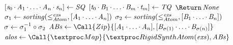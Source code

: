 \documentclass[acmsmall]{acmart}
\begin{document}
\begin{algorithm}
  \caption{\RigidSynth}
  \label{alg:rigidsynth}
  \begin{algorithmic}[1]
    \Function{\RigidSynthAtom}{$\Atom{},\AtomAlt{},\Examples$}
    \Switch{$(\Atom{}, \AtomAlt)$}
    \Case {(\UserDef, \UserDefAlt)}
    \If {$\UserDef \AtomLeq^\Examples \UserDefAlt \BooleanAnd \UserDefAlt
      \AtomLeq^\Examples \UserDef$}
    \State \ReturnVal{\SomeOf{\IdentityLensOf{\UserDef}}}
    \Else
    \State \ReturnVal{\None}
    \EndIf
    \EndCase
    \Case {(\StarOf{\DNFRegex},\StarOf{\DNFRegexAlt})}
    \Switch{$\RigidSynth(\DNFRegex,\DNFRegexAlt,\Examples)$}
    \CaseTwo{\SomeOf{\DNFLens}}{\ReturnVal{\IterateLensOf{\DNFLens}}}
    \EndCaseTwo
    \CaseTwo {\None}{$\ReturnVal{\None}$}
    \EndCaseTwo
    \EndSwitch
    \EndCase
    \CaseTwo {\_}{\ReturnVal{\None}}
    \EndCaseTwo
    \EndSwitch
    \EndFunction

    \Statex

    \Function{\RigidSynthSequence}{$\Sequence,\SequenceAlt,\Examples$}
    \State $[\mathit{s}_0 \mkern-1mu\cdot\mkern-1mu \mathit{A}_1 \mkern-1mu\cdot\mkern-1mu \ldots \mkern-1mu\cdot\mkern-1mu \mathit{A}_n
      \mkern-1mu\cdot\mkern-1mu \mathit{s}_n] \gets
    \mathit{SQ}$
    \State $[\mathit{t}_0 \mkern-1mu\cdot\mkern-1mu \mathit{B}_1 \mkern-1mu\cdot\mkern-1mu \ldots \mkern-1mu\cdot\mkern-1mu
      \mathit{B}_m \mkern-1mu\cdot\mkern-1mu \mathit{t}_m] \gets
    \mathit{TQ}$
    \State $\ReturnVal{\None}$
    \EndIf
    \State $\sigma_1 \gets \mathit{sorting}(\leq_{Atom}^{\mathit{exs}},[ \mathit{A}_1
        \mkern-1mu\cdot\mkern-1mu \ldots \mkern-1mu\cdot\mkern-1mu \mathit{A}_n ])$
    \State $\sigma_2 \gets \mathit{sorting}(\leq_{Atom}^{\mathit{exs}},[ \mathit{B}_1
        \mkern-1mu\cdot\mkern-1mu \ldots \mkern-1mu\cdot\mkern-1mu \mathit{B}_n ])$
    \State $\sigma \gets \sigma_1^{-1} \circ \sigma_2$
    \State $\mathit{ABs} \gets
    \Call{Zip}{\ListOf{\Atom_1 \SeqSep \ldots \SeqSep
        \Atom_n},\ListOf{\AtomAlt_{\sigma(1)} \SeqSep \ldots \SeqSep \AtomAlt_{\sigma(n)}}}$
    \State $\mathit{alos} \gets
    \Call{\Map}{\RigidSynthAtom(\Examples),\mathit{ABs}}$
    \EndCaseTwo
    \CaseTwo {\None}{$\ReturnVal{\None}$}
    \EndCaseTwo
    \EndSwitch
    \EndFunction

    \Statex


\end{algorithmic}
\end{algorithm}
\end{document}

